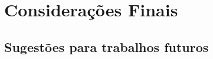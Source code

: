 
\chapter{Considerações Finais}
\label{chap:consideracoesFinais} 



    \section{Sugestões para trabalhos futuros}
    
    